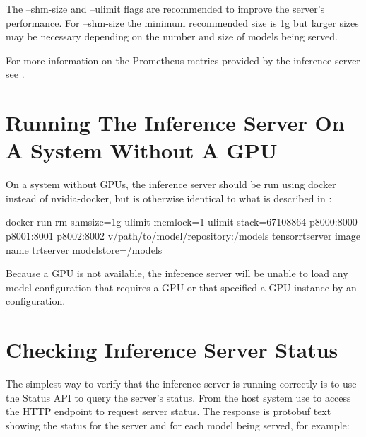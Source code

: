\documentclass[letterpaper,10pt,english]{sphinxmanual}
\begin{document}
The --shm-size and --ulimit flags are recommended to improve the
server’s performance. For --shm-size the minimum recommended size is
1g but larger sizes may be necessary depending on the number and size
of models being served.

For more information on the Prometheus metrics provided by the
inference server see {\hyperref[\detokenize{metrics:section-metrics}]{}}.


\section{Running The Inference Server On A System Without A GPU}
\label{\detokenize{run:running-the-inference-server-on-a-system-without-a-gpu}}\label{\detokenize{run:section-running-the-inference-server-without-gpu}}
On a system without GPUs, the inference server should be run using
docker instead of nvidia-docker, but is otherwise identical to what is
described in {\hyperref[\detokenize{run:section-running-the-inference-server}]{}}:

\begin{sphinxVerbatim}[commandchars=\\\{\}]
\PYGZdl{} docker run \PYGZhy{}\PYGZhy{}rm \PYGZhy{}\PYGZhy{}shm\PYGZhy{}size=1g \PYGZhy{}\PYGZhy{}ulimit memlock=\PYGZhy{}1 \PYGZhy{}\PYGZhy{}ulimit stack=67108864 \PYGZhy{}p8000:8000 \PYGZhy{}p8001:8001 \PYGZhy{}p8002:8002 \PYGZhy{}v/path/to/model/repository:/models \PYGZlt{}tensorrtserver image name\PYGZgt{} trtserver \PYGZhy{}\PYGZhy{}model\PYGZhy{}store=/models
\end{sphinxVerbatim}

Because a GPU is not available, the inference server will be unable to
load any model configuration that requires a GPU or that specified a
GPU instance by an {\hyperref[\detokenize{model_configuration:section-instance-groups}]{}}
configuration.


\section{Checking Inference Server Status}
\label{\detokenize{run:checking-inference-server-status}}\label{\detokenize{run:section-checking-inference-server-status}}
The simplest way to verify that the inference server is running
correctly is to use the Status API to query the server’s status. From
the host system use  to access the HTTP endpoint to request
server status. The response is protobuf text showing the status for
the server and for each model being served, for example:
\end{document}
